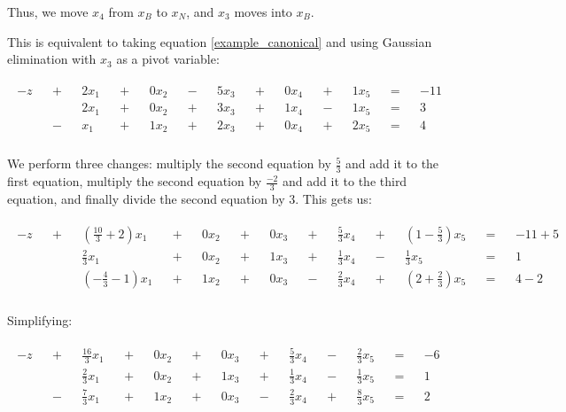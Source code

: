 Thus, we move $x_4$ from $x_B$ to $x_N$, and $x_3$ moves into $x_B$.

This is equivalent to taking equation \ref{example_canonical} and using Gaussian elimination with $x_3$ as a pivot variable:

\begin{eqnarray}
\begin{aligned}
-z && + && 2x_1 &&+&& 0x_2 && - && 5x_3 && + && 0x_4 && + && 1x_5 &&=&&-11& \\
&&&& 2x_1 &&+&& 0x_2 &&+ && 3x_3 && + && 1x_4 & &- && 1x_5 &&=&& 3 & \\
&& - && x_1 &&+&& 1x_2 && + && 2x_3 && + && 0x_4 && + && 2x_5 &&=&& 4 & \\
\end{aligned}
\end{eqnarray}

We perform three changes: multiply the second equation by $\frac{5}{3}$ and add it to the first equation, multiply the second equation by $\frac{-2}{3}$ and add it to the third equation, and finally divide the second equation by 3. This gets us:

\begin{eqnarray}
\begin{aligned}
-z && + && (\frac{10}{3} + 2) x_1 &&+&& 0x_2 && + && 0x_3 && + && \frac{5}{3}x_4 && + && (1 - \frac{5}{3})x_5 &&=&&-11+5& \\
&&&& \frac{2}{3}x_1 &&+&& 0x_2 &&+ && 1x_3 && + && \frac{1}{3}x_4 & &- && \frac{1}{3}x_5 &&=&& 1 & \\
&&&& (-\frac{4}{3} - 1)x_1 &&+&& 1x_2 && + && 0x_3 && - && \frac{2}{3}x_4 && + && (2+\frac{2}{3})x_5 &&=&& 4-2 & \\
\end{aligned}
\end{eqnarray}

Simplifying:

\begin{eqnarray}
\label{example_x3pivot}
\begin{aligned}
-z && + && \frac{16}{3} x_1 &&+&& 0x_2 && + && 0x_3 && + && \frac{5}{3}x_4 && - && \frac{2}{3}x_5 &&=&&-6& \\
&&&& \frac{2}{3}x_1 &&+&& 0x_2 &&+ && 1x_3 && + && \frac{1}{3}x_4 & &- && \frac{1}{3}x_5 &&=&& 1 & \\
&&-&& \frac{7}{3}x_1 &&+&& 1x_2 && + && 0x_3 && - && \frac{2}{3}x_4 && + && \frac{8}{3}x_5 &&=&& 2 & \\
\end{aligned}
\end{eqnarray}

